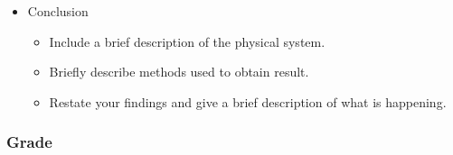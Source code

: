 \begin{itemize}
\item Conclusion
  \begin{itemize}
  \item Include a brief description of the physical system.
  \item Briefly describe methods used to obtain result.
  \item Restate your findings and give a brief description of what is
    happening.
  \end{itemize}


\end{itemize}



\subsubsection{Grade}


